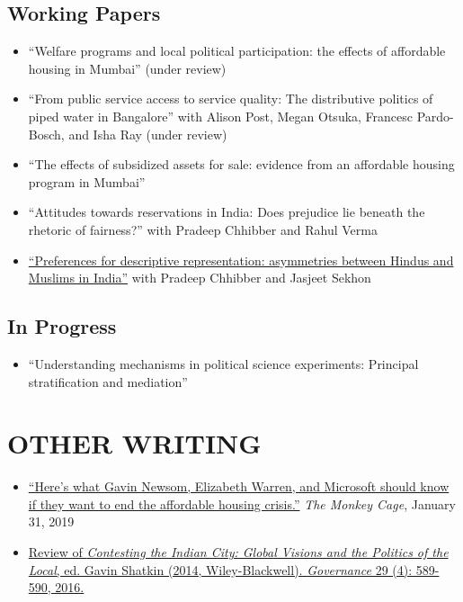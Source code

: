 \documentclass[11pt]{article}
\begin{document}
\subsection*{Working Papers}

\begin{itemize}
	\item[]``Welfare programs and local political participation: the effects of affordable housing in Mumbai'' (under review)

		\item[]``From public service access to service quality: The distributive politics of piped water in Bangalore'' with Alison Post, Megan Otsuka, Francesc Pardo-Bosch, and Isha Ray (under review)
		\item[]``The effects of subsidized assets for sale: evidence from an affordable housing program in Mumbai'' 
		\item[]``Attitudes towards reservations in India: Does prejudice lie beneath the rhetoric of fairness?'' with Pradeep Chhibber and Rahul Verma
		\item[] \href{http://sekhon.berkeley.edu/papers/cks_public.pdf}{``Preferences for descriptive representation: asymmetries between Hindus and Muslims in India''} with Pradeep Chhibber and Jasjeet Sekhon
\end{itemize}

\subsection*{In Progress}
\begin{itemize}
	\item[] ``Understanding mechanisms in political science experiments: Principal stratification and mediation''
	\end{itemize}

\section*{OTHER WRITING}
\begin{itemize}
\item[]\href{https://www.washingtonpost.com/news/monkey-cage/wp/2019/01/31/heres-what-gavin-newsom-elizabeth-warren-and-microsoft-should-know-if-want-to-end-the-affordable-housing-crisis/?tid=sm_tw_cage}{``Here's what Gavin Newsom, Elizabeth Warren, and Microsoft should know if they want to end the affordable housing crisis.''} \textit{The Monkey Cage}, January 31, 2019
\item[] \href{http://onlinelibrary.wiley.com/doi/10.1111/gove.12241/abstract}{Review of \textit{Contesting the Indian City: Global Visions and the Politics of the Local}, ed. Gavin Shatkin (2014, Wiley-Blackwell). \textit{Governance} 29 (4): 589-590, 2016.} \
\end{itemize}
\end{document}
